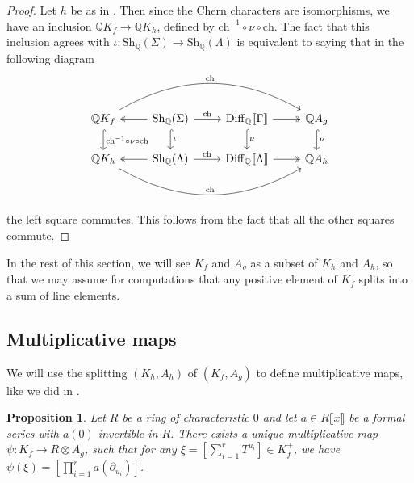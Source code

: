 \documentclass[oneside]{amsart}
\theoremstyle{plain}
\newtheorem{proposition}[theorem]{Proposition}
\theoremstyle{definition}
\newcommand{\Q}{{\mathbb{Q}}}
\newcommand{\Diff}{{\mathrm{Diff}}}
\newcommand{\Sh}{{\mathrm{Sh}}}
\newcommand{\ch}{{\mathrm{ch}}}
\begin{document}
\begin{proof}
    Let $h$ be as in . Then since the Chern characters are isomorphisms, we have an inclusion $\Q K_f \to \Q K_h$, defined by $\ch^{-1} \circ \nu \circ \ch$. The fact that this inclusion agrees with $\iota: \Sh_\Q(\Sigma) \to \Sh_\Q(\Lambda)$ is equivalent to saying that in the following diagram
    \[
    \begin{tikzcd}
    \Q K_f \arrow[rrr, "\ch", bend left] \arrow[d, "\ch^{-1}\circ \nu \circ \ch", hook] & \Sh_\Q(\Sigma) \arrow[l, two heads] \arrow[r, "\ch"] \arrow[d, "\iota", hook] & \Diff_\Q\llbracket \Gamma \rrbracket \arrow[r, two heads] \arrow[d, "\nu", hook] & \Q A_g \arrow[d, "\nu", hook]\\
    \Q K_h \arrow[rrr, "\ch", hook', bend right]     & \Sh_\Q(\Lambda) \arrow[l, two heads] \arrow[r, "\ch"]                         & \Diff_\Q\llbracket \Lambda \rrbracket \arrow[r, two heads]                       & \Q A_h
    \end{tikzcd}
    \]
    the left square commutes. This follows from the fact that all the other squares commute.
\end{proof}

In the rest of this section, we will see $K_f$ and $A_g$ as a subset of $K_h$ and $A_h$, so that we may assume for computations that any positive element of $K_f$ splits into a sum of line elements.

\subsection{Multiplicative maps}

We will use the splitting $(K_h, A_h)$ of $(K_f, A_g)$ to define multiplicative maps, like we did in .

\begin{proposition}
    \label{prop:mult-map-A_g-general}
    Let $R$ be a ring of characteristic $0$ and let
    $a \in R \llbracket x \rrbracket$ be a formal series with $a(0)$ invertible in $R$.
    There exists a unique multiplicative map $\psi: K_f \to R \otimes A_g$, such that for any 
    $\xi = \left[\sum_{i = 1}^r T^{u_i}\right] \in K_f^+$, we have
    $\psi(\xi) = \left[\prod_{i = 1}^r a(\partial_{u_i})\right]$.
\end{proposition}
\end{document}

